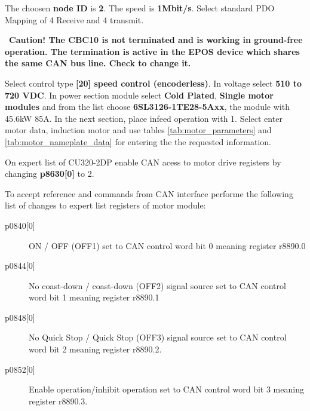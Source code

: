\begin{description}[align=left, labelwidth=10em, leftmargin=5em, style=nextline]
	\item[CAN Module CBC10] The choosen \textbf{node ID} is \textbf{2}. The speed is \textbf{1Mbit/s}. Select standard PDO Mapping of 4 Receive and 4 transmit.
	\vspace{1ex}
	\begin{mdframed}[backgroundcolor=red!20, roundcorner=10pt, innertopmargin=5pt, innerbottommargin=5pt, skipabove=0pt]
		\Warning \, \textbf{Caution! The CBC10 is not terminated and is working in ground-free operation. The termination is active in the \gls{EPOS} device which shares the same CAN bus line. Check \cite{siemens_comissioning_manual} to change it.}
	\end{mdframed}
	\item[Motor configuration:] Select control type \textbf{[20] speed control (encoderless)}. In voltage select \textbf{510 to 720 VDC}. In power section module select \textbf{Cold Plated}, \textbf{Single motor modules} and from the list choose \textbf{6SL3126-1TE28-5Axx}, the module with 45.6kW 85A. In the next section, place infeed operation with 1. Select enter motor data, induction motor and use tables \ref{tab:motor_parameters} and \ref{tab:motor_nameplate_data} for entering the the requested information.
	\item[Enable CAN access to motor drive] On expert list of CU320-2DP enable CAN acess to motor drive registers by changing \textbf{p8630[0]} to 2.
	\item[CAN interconnect] To accept reference and commands from CAN interface performe the following list of changes to expert list registers of motor module:
	\begin{description}
		\item[p0840{[0]}] ON / OFF (OFF1) set to CAN control word bit 0 meaning register r8890.0
		\item[p0844{[0]}] No coast-down / coast-down (OFF2) signal source set to CAN control word bit 1 meaning register r8890.1
		\item[p0848{[0]}] No Quick Stop / Quick Stop (OFF3) signal source set to CAN control word bit 2 meaning register r8890.2.
		\item[p0852{[0]}] Enable operation/inhibit operation set to CAN control word bit 3 meaning register r8890.3.

\end{description}
\end{description}

